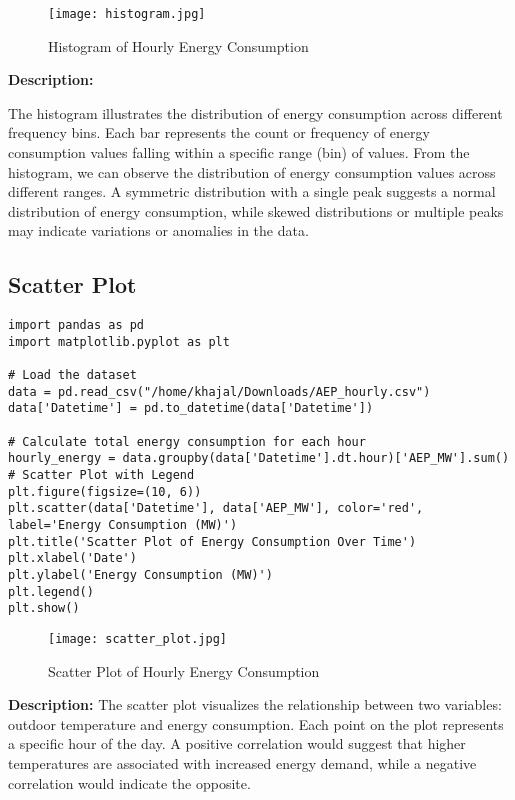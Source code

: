 \documentclass{article}
\begin{document}
\begin{figure}[H]
    \centering
    \texttt{[image: histogram.jpg]}
    \caption{Histogram of Hourly Energy Consumption}
    \label{fig:Histogram}
\end{figure}
\textbf{Description:}

The histogram illustrates the distribution of energy consumption across different frequency bins. Each bar represents the count or frequency of energy consumption values falling within a specific range (bin) of values.
From the histogram, we can observe the distribution of energy consumption values across different ranges. A symmetric distribution with a single peak suggests a normal distribution of energy consumption, while skewed distributions or multiple peaks may indicate variations or anomalies in the data.
\subsection{Scatter Plot}
\begin{lstlisting}[caption={Python code for scatter plot}]
import pandas as pd
import matplotlib.pyplot as plt

# Load the dataset
data = pd.read_csv("/home/khajal/Downloads/AEP_hourly.csv")
data['Datetime'] = pd.to_datetime(data['Datetime'])

# Calculate total energy consumption for each hour
hourly_energy = data.groupby(data['Datetime'].dt.hour)['AEP_MW'].sum()
# Scatter Plot with Legend
plt.figure(figsize=(10, 6))
plt.scatter(data['Datetime'], data['AEP_MW'], color='red', label='Energy Consumption (MW)')
plt.title('Scatter Plot of Energy Consumption Over Time')
plt.xlabel('Date')
plt.ylabel('Energy Consumption (MW)')
plt.legend()
plt.show()

\end{lstlisting}

\begin{figure}[H]
    \centering
    \texttt{[image: scatter\_plot.jpg]}
    \caption{Scatter Plot of Hourly Energy Consumption}
    \label{fig:Scatter_plot}
\end{figure}
\textbf{Description:}
The scatter plot visualizes the relationship between two variables: outdoor temperature and energy consumption. Each point on the plot represents a specific hour of the day.
 A positive correlation would suggest that higher temperatures are associated with increased energy demand, while a negative correlation would indicate the opposite. 
\end{document}
